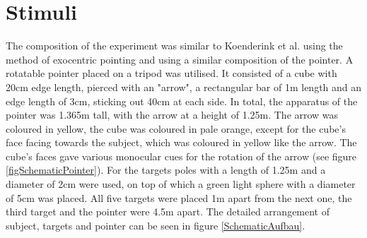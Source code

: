 \section{Stimuli}
The composition of the experiment was similar to Koenderink et al. \citeyear{Koenderink.2000} using the method of exocentric pointing and using a similar composition of the pointer. A rotatable pointer placed on a tripod was utilised. It consisted of a cube with 20cm edge length, pierced with an "arrow", a rectangular bar of 1m length and an edge length of 3cm, sticking out 40cm at each side. In total, the apparatus of the pointer was 1.365m tall, with the arrow at a height of 1.25m. The arrow was coloured in yellow, the cube was coloured in pale orange, except for the cube's face facing towards the subject, which was coloured in yellow like the arrow. The  cube's faces  gave various monocular cues for the rotation of the arrow (see figure \ref{figSchematicPointer}).
For the targets poles with a length of 1.25m and a diameter of 2cm were used, on top of which a green light sphere with a diameter of 5cm was placed. All five targets were placed 1m apart from the next one, the third target and the pointer were 4.5m apart. The detailed arrangement of subject, targets and pointer can be seen in figure \ref{SchematicAufbau}.

